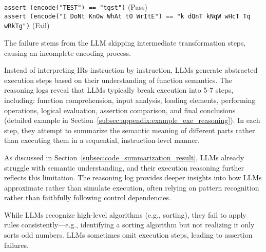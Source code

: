 \texttt{assert (encode("TEST") == "tgst")} \quad (Pass) \\
\texttt{assert (encode("I DoNt KnOw WhAt tO WrItE") == "k dQnT kNqW wHcT Tq wRkTg")} \quad (Fail)

The failure stems from the LLM skipping intermediate transformation steps, causing an incomplete encoding process.


Instead of interpreting IRs instruction by instruction, LLMs generate abstracted execution steps based on their understanding of function semantics. The reasoning logs reveal that LLMs typically break execution into 5-7 steps, including: function comprehension, input analysis, loading elements, performing operations, logical evaluation, assertion comparison, and final conclusions (detailed example in Section~\ref{subsec:appendix:example_exe_reasoning}). In each step, they attempt to summarize the semantic meaning of different parts rather than executing them in a sequential, instruction-level manner.

As discussed in Section~\ref{subsec:code_summarization_result}, LLMs already struggle with semantic understanding, and their execution reasoning further reflects this limitation. The reasoning log provides deeper insights into how LLMs approximate rather than simulate execution, often relying on pattern recognition rather than faithfully following control dependencies.

 While LLMs recognize high-level algorithms (e.g., sorting), they fail to apply rules consistently—e.g., identifying a sorting algorithm but not realizing it only sorts odd numbers. LLMs sometimes omit execution steps, leading to assertion failures. 

